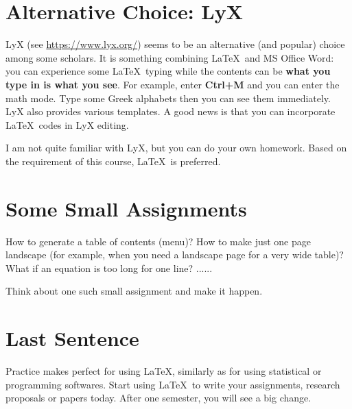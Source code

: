 \documentclass[10pt]{extarticle}
\theoremstyle{theorem}
\theoremstyle{lemma}
\theoremstyle{proposition}
\theoremstyle{corollary}
\theoremstyle{assumption}
\theoremstyle{model}
\theoremstyle{property}
\theoremstyle{example}
\theoremstyle{algorithm}
\theoremstyle{definition}
\theoremstyle{axiom}
\theoremstyle{remark}
\begin{document}
\renewcommand\refname{References}




\section{Alternative Choice: LyX}

LyX (see \href{https://www.lyx.org/}{https://www.lyx.org/}) seems to be an alternative (and popular) choice among some scholars. It is something combining \LaTeX \ and MS Office Word: you can experience some \LaTeX \ typing while the contents can be \textbf{what you type in is what you see}. For example, enter \textbf{Ctrl+M} and you can enter the math mode. Type some Greek alphabets then you can see them immediately. LyX also provides various templates. A good news is that you can incorporate \LaTeX \ codes in LyX editing.

I am not quite familiar with LyX, but you can do your own homework. Based on the requirement of this course, \LaTeX \ is preferred.

\section{Some Small Assignments}

How to generate a table of contents (menu)? How to make just one page landscape (for example, when you need a landscape page for a very wide table)? What if an equation is too long for one line? ......

Think about one such small assignment and make it happen.

\section{Last Sentence}
Practice makes perfect for using \LaTeX, similarly as for using statistical or programming softwares. Start using \LaTeX \ to write your assignments, research proposals or papers today. After one semester, you will see a big change.
\end{document}
